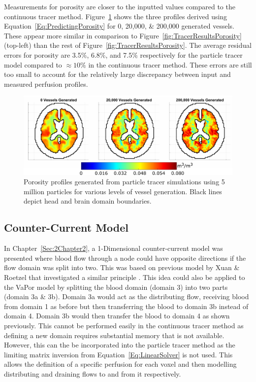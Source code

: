 \documentclass[11pt,english,a4paper,twoside,openright]{report}
\begin{document}
{{{{{{{Measurements for porosity are closer to the inputted values compared to the continuous tracer method. Figure~\ref{fig:MonteCarloResultsPorosity} shows the three profiles derived using Equation~\ref{Eq:PredictingPorosity} for 0, 20,000, \& 200,000 generated vessels. These appear more similar in comparison to Figure~\ref{fig:TracerResultsPorosity} (top-left) than the rest of Figure~\ref{fig:TracerResultsPorosity}. The average residual errors for porosity are 3.5\%, 6.8\%, and 7.5\% respectively for the particle tracer model compared to ${\approx}10\%$ in the continuous tracer method. These errors are still too small to account for the relatively large discrepancy between input and measured perfusion profiles. 

\begin{figure}[h]
	\centering
	\includegraphics[width=\textwidth]{Chapter4/MonteCarloPorosity}
	\caption[Porosity profiles generated from particle tracer simulations using 5 million particles for various levels of vessel generation]{Porosity profiles generated from particle tracer simulations using 5 million particles for various levels of vessel generation. Black lines depict head and brain domain boundaries.}
	\label{fig:MonteCarloResultsPorosity}
\end{figure}

\subsection{Counter-Current Model}
\label{Sec:4CounterCurrentModel}

In Chapter~\ref{Sec:2Chapter2}, a 1-Dimensional counter-current model was presented where blood flow through a node could have opposite directions if the flow domain was split into two. This was based on previous model by Xuan \& Roetzel that investigated a similar principle \cite{xuan1997bioheat}. This idea could also be applied to the VaPor model by splitting the blood domain (domain 3) into two parts (domain 3a \& 3b). Domain 3a would act as the distributing flow, receiving blood from domain 1 as before but then transferring the blood to domain 3b instead of domain 4. Domain 3b would then transfer the blood to domain 4 as shown previously. This cannot be performed easily in the continuous tracer method as defining a new domain requires substantial memory that is not available. However, this can the be incorporated into the particle tracer method as the limiting matrix inversion from Equation~\ref{Eq:LinearSolver} is not used. This allows the definition of a specific perfusion for each voxel and then modelling distributing and draining flows to and from it respectively. 

}}}}}}}
\end{document}
